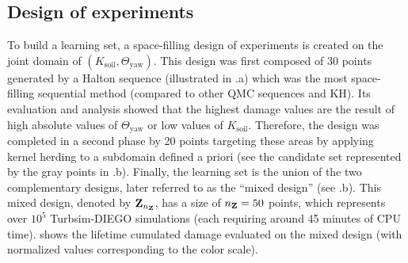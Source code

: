 \subsection{Design of experiments}
To build a learning set, a space-filling design of experiments is created on the joint domain of $(K_{\mathrm{soil}}, \Theta_{\mathrm{yaw}})$. 
This design was first composed of 30 points generated by a Halton sequence (illustrated in .a) which was the most space-filling sequential method (compared to other QMC sequences and KH). 
Its evaluation and analysis showed that the highest damage values are the result of high absolute values of $\Theta_{\mathrm{yaw}}$ or low values of $K_{\mathrm{soil}}$. 
Therefore, the design was completed in a second phase by 20 points targeting these areas by applying kernel herding to a subdomain defined a priori (see the candidate set represented by the gray points in .b). 
Finally, the learning set is the union of the two complementary designs, later referred to as the ``mixed design'' (see .b). 
This mixed design, denoted by ${\bf Z}_{n_{\bf Z}}$, has a size of $n_{\bf Z}=50$ points, which represents over $10^5$ Turbsim-DIEGO simulations (each requiring around 45 minutes of CPU time).
 shows the lifetime cumulated damage evaluated on the mixed design (with normalized values corresponding to the color scale). 





